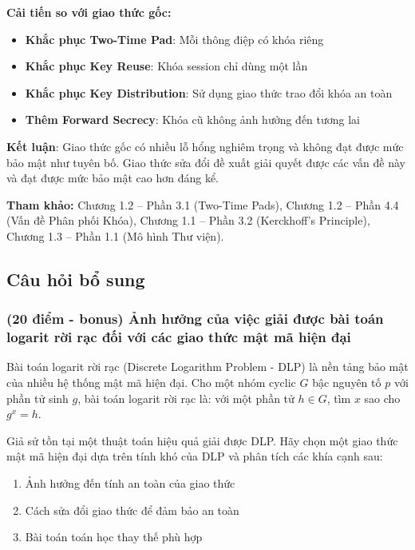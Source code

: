 \textbf{Cải tiến so với giao thức gốc:}
\begin{itemize}
    \item \textbf{Khắc phục Two-Time Pad}: Mỗi thông điệp có khóa riêng
    \item \textbf{Khắc phục Key Reuse}: Khóa session chỉ dùng một lần
    \item \textbf{Khắc phục Key Distribution}: Sử dụng giao thức trao đổi khóa an toàn
    \item \textbf{Thêm Forward Secrecy}: Khóa cũ không ảnh hưởng đến tương lai
\end{itemize}

\textbf{Kết luận}: Giao thức gốc có nhiều lỗ hổng nghiêm trọng và không đạt được mức bảo mật như tuyên bố. Giao thức sửa đổi đề xuất giải quyết được các vấn đề này và đạt được mức bảo mật cao hơn đáng kể.

\textbf{Tham khảo:} Chương 1.2 – Phần 3.1 (Two-Time Pads), Chương 1.2 – Phần 4.4 (Vấn đề Phân phối Khóa), Chương 1.1 – Phần 3.2 (Kerckhoff's Principle), Chương 1.3 – Phần 1.1 (Mô hình Thư viện).

\subsection{Câu hỏi bổ sung}

\subsubsection{(20 điểm - bonus) Ảnh hưởng của việc giải được bài toán logarit rời rạc đối với các giao thức mật mã hiện đại}

Bài toán logarit rời rạc (Discrete Logarithm Problem - DLP) là nền tảng bảo mật của nhiều hệ thống mật mã hiện đại. Cho một nhóm cyclic $G$ bậc nguyên tố $p$ với phần tử sinh $g$, bài toán logarit rời rạc là: với một phần tử $h \in G$, tìm $x$ sao cho $g^x = h$.

Giả sử tồn tại một thuật toán hiệu quả giải được DLP. Hãy chọn một giao thức mật mã hiện đại dựa trên tính khó của DLP và phân tích các khía cạnh sau:

\begin{enumerate}
    \item Ảnh hưởng đến tính an toàn của giao thức
    \item Cách sửa đổi giao thức để đảm bảo an toàn
    \item Bài toán toán học thay thế phù hợp
\end{enumerate}

